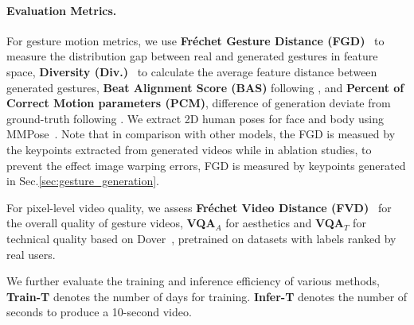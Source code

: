 \vspace{-0.2cm}
\paragraph{Evaluation Metrics.}
For gesture motion metrics, we use \textbf{Fréchet Gesture Distance (FGD)}~\cite{yoon2020speech} to measure the distribution gap between real and generated gestures in feature space, \textbf{Diversity (Div.)}~\cite{lee2019dancing} to calculate the average feature distance between generated gestures, \textbf{Beat Alignment Score (BAS)} following \cite{li2021ai}, and \textbf{Percent of
Correct Motion parameters (PCM)}, difference of generation deviate from ground-truth following \cite{diffsheg}. We extract 2D human poses for face and body using MMPose~\cite{mmpose2020}. Note that in comparison with other models, the FGD is measued by the keypoints extracted from generated videos while in ablation studies, to prevent the effect image warping errors, FGD is measured by keypoints generated in Sec.\ref{sec:gesture_generation}.

For pixel-level video quality, we assess \textbf{Fréchet Video Distance (FVD)}~\cite{unterthiner2018towards} for the overall quality of gesture videos, \textbf{VQA$_A$} for aesthetics and \textbf{VQA$_T$} for technical quality based on Dover~\cite{wu2023dover}, pretrained on datasets with labels ranked by real users.

We further evaluate the training and inference efficiency of various methods, \textbf{Train-T} denotes the number of days for training. \textbf{Infer-T} denotes the number of seconds to produce a 10-second video.

